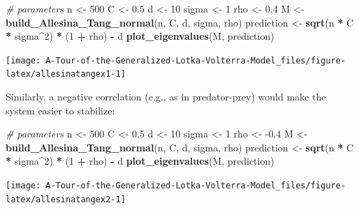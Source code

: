 \documentclass[]{book}
\newenvironment{Shaded}{\begin{snugshade}}{\end{snugshade}}
\newcommand{\CommentTok}[1]{\textcolor[rgb]{0.56,0.35,0.01}{\textit{#1}}}
\newcommand{\DecValTok}[1]{\textcolor[rgb]{0.00,0.00,0.81}{#1}}
\newcommand{\FloatTok}[1]{\textcolor[rgb]{0.00,0.00,0.81}{#1}}
\newcommand{\KeywordTok}[1]{\textcolor[rgb]{0.13,0.29,0.53}{\textbf{#1}}}
\newcommand{\NormalTok}[1]{#1}
\newcommand{\OperatorTok}[1]{\textcolor[rgb]{0.81,0.36,0.00}{\textbf{#1}}}
\newcommand{\StringTok}[1]{\textcolor[rgb]{0.31,0.60,0.02}{#1}}
\begin{document}
\begin{Shaded}
\begin{Highlighting}[]
\CommentTok{# parameters}
\NormalTok{n <-}\StringTok{ }\DecValTok{500}
\NormalTok{C <-}\StringTok{ }\FloatTok{0.5}
\NormalTok{d <-}\StringTok{ }\DecValTok{10}
\NormalTok{sigma <-}\StringTok{ }\DecValTok{1}
\NormalTok{rho <-}\StringTok{ }\FloatTok{0.4}
\NormalTok{M <-}\StringTok{ }\KeywordTok{build_Allesina_Tang_normal}\NormalTok{(n, C, d, sigma, rho)}
\NormalTok{prediction <-}\StringTok{ }\KeywordTok{sqrt}\NormalTok{(n }\OperatorTok{*}\StringTok{ }\NormalTok{C }\OperatorTok{*}\StringTok{ }\NormalTok{sigma}\OperatorTok{^}\DecValTok{2}\NormalTok{) }\OperatorTok{*}\StringTok{ }\NormalTok{(}\DecValTok{1} \OperatorTok{+}\StringTok{ }\NormalTok{rho) }\OperatorTok{-}\StringTok{ }\NormalTok{d}
\KeywordTok{plot_eigenvalues}\NormalTok{(M, prediction)}
\end{Highlighting}
\end{Shaded}

\begin{center}\texttt{[image: A-Tour-of-the-Generalized-Lotka-Volterra-Model\_files/figure-latex/allesinatangex1-1]} \end{center}

Similarly, a negative correlation (e.g., as in predator-prey) would make the system easier to stabilize:

\begin{Shaded}
\begin{Highlighting}[]
\CommentTok{# parameters}
\NormalTok{n <-}\StringTok{ }\DecValTok{500}
\NormalTok{C <-}\StringTok{ }\FloatTok{0.5}
\NormalTok{d <-}\StringTok{ }\DecValTok{10}
\NormalTok{sigma <-}\StringTok{ }\DecValTok{1}
\NormalTok{rho <-}\StringTok{ }\FloatTok{-0.4}
\NormalTok{M <-}\StringTok{ }\KeywordTok{build_Allesina_Tang_normal}\NormalTok{(n, C, d, sigma, rho)}
\NormalTok{prediction <-}\StringTok{ }\KeywordTok{sqrt}\NormalTok{(n }\OperatorTok{*}\StringTok{ }\NormalTok{C }\OperatorTok{*}\StringTok{ }\NormalTok{sigma}\OperatorTok{^}\DecValTok{2}\NormalTok{) }\OperatorTok{*}\StringTok{ }\NormalTok{(}\DecValTok{1} \OperatorTok{+}\StringTok{ }\NormalTok{rho) }\OperatorTok{-}\StringTok{ }\NormalTok{d}
\KeywordTok{plot_eigenvalues}\NormalTok{(M, prediction)}
\end{Highlighting}
\end{Shaded}

\begin{center}\texttt{[image: A-Tour-of-the-Generalized-Lotka-Volterra-Model\_files/figure-latex/allesinatangex2-1]} \end{center}
\end{document}
